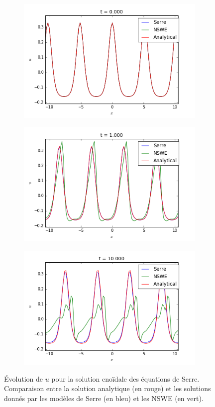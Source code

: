 \begin{figure}[h!]
	\begin{subfigure}{.3\linewidth}
		\includegraphics[scale=.3]{figures/Serre/4x4cnoidal1u.png}	
	\end{subfigure}
	\begin{subfigure}{.3\linewidth}
		\includegraphics[scale=.3]{figures/Serre/4x4cnoidal2u.png}	
	\end{subfigure}
	\begin{subfigure}{.3\linewidth}
		\includegraphics[scale=.3]{figures/Serre/4x4cnoidal3u.png}	
	\end{subfigure}
	\caption{Évolution de $u$ pour la solution cnoïdale des équations de Serre. Comparaison entre la solution analytique (en rouge) et les solutions donnés par les modèles de Serre (en bleu) et les NSWE (en vert).  \label{fig:cnoidalu}}
\end{figure}

